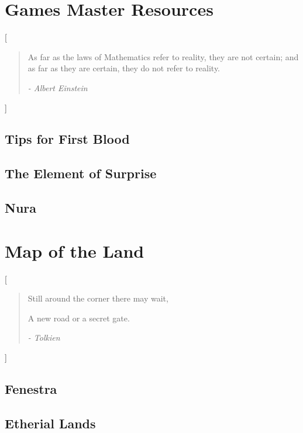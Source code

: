 \documentclass[a4paper,openany]{report}
\begin{document}
\tableofcontents




\part{Games Master Resources}
[\vspace{4cm}\begin{quote}
\center As far as the laws of Mathematics refer to reality, they are not certain; and as far as they are certain, they do not refer to reality.

\flushright	\textit{- Albert Einstein}
\end{quote}]


\chapter{Tips for First Blood}



\chapter[Random Things]{The Element of Surprise}



\chapter{Nura}



\part{Map of the Land}
[\vspace{4cm}\center \begin{quote}Still around the corner there may wait,

A new road or a secret gate.

	\flushright\textit{- Tolkien}
\end{quote}]

\chapter{Fenestra}




\chapter{Etherial Lands}
\end{document}

